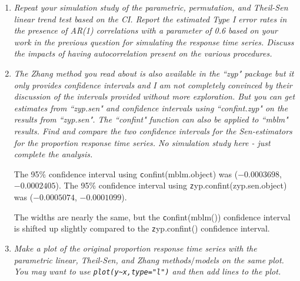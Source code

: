\documentclass[11pt]{article}\usepackage[]{graphicx}\usepackage[]{color}
\makeatletter
\newenvironment{kframe}{%
 \def\at@end@of@kframe{}%
 \ifinner\ifhmode%
  \def\at@end@of@kframe{\end{minipage}}%
  \begin{minipage}{\columnwidth}%
 \fi\fi%
 \def\FrameCommand##1{\hskip\@totalleftmargin \hskip-\fboxsep
 \colorbox{shadecolor}{##1}\hskip-\fboxsep
     \hskip-\linewidth \hskip-\@totalleftmargin \hskip\columnwidth}%
 \MakeFramed {\advance\hsize-\width
   \@totalleftmargin\z@ \linewidth\hsize
   \@setminipage}}%
 {\par\unskip\endMakeFramed%
 \at@end@of@kframe}
\newenvironment{knitrout}{}{} %
\makeatother
\begin{document}
\begin{enumerate}
\begin{enumerate}
{\bf I must be doing something wrong, these are completely off.}


\begin{knitrout}\footnotesize
{}\color{fgcolor}\begin{kframe}
\begin{verbatim}
[1] 0.03205374
[1] 0.03125673
\end{verbatim}
\end{kframe}
\end{knitrout}

\end{enumerate}

\item%
{\it Repeat your simulation study of the parametric, permutation, and Theil-Sen linear trend test based on the CI. Report the estimated Type I error rates in the presence of AR(1) correlations with a parameter of 0.6 based on your work in the previous question for simulating the response time series. Discuss the impacts of having autocorrelation present on the various procedures.}

\item%
{\it The Zhang method you read about is also available in the ``zyp" package but it only provides confidence intervals and I am not completely convinced by their discussion of the intervals provided without more exploration. But you can get estimates from ``zyp.sen" and confidence intervals using ``confint.zyp" on the results from ``zyp.sen". The ``confint" function can also be applied to ``mblm" results. Find and compare the two confidence intervals for the Sen-estimators for the proportion response time series. No simulation study here - just complete the analysis.}





The 95\% confidence interval using {\texttt confint(mblm.object)} was (\ensuremath{-0.0003698}, \ensuremath{-0.0002405}).
The 95\% confidence interval using {\texttt zyp.confint(zyp.sen.object)} was (\ensuremath{-0.0005074}, \ensuremath{-0.0001099}).

The widths are nearly the same, but the {\texttt confint(mblm())} confidence interval is shifted up slightly compared to the {\texttt zyp.confint()} confidence interval.


\item%
{\it Make a plot of the original proportion response time series with the parametric linear, Theil-Sen, and Zhang methods$/$models on the same plot. You may want to use \verb|plot(y~x,type="l")| and then add lines to the plot.}


\end{enumerate}
\end{document}
